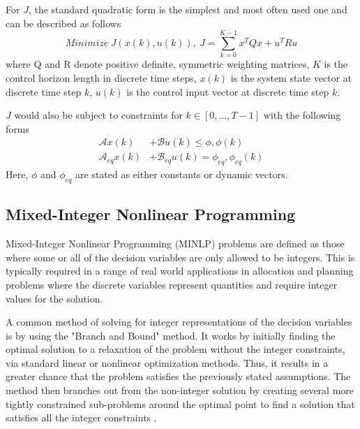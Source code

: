 \noindent For $J$, the standard quadratic form is the simplest and most often used one and can be described as follows
\begin{equation}
    Minimize\:J(x(k),u(k)),\: J=\sum_{k=0}^{K-1} x^{T}Qx + u^{T}Ru
\end{equation}
where Q and R denote positive definite, symmetric weighting matrices, $K$ is the control horizon length in discrete time steps, $x(k)$ is the system state vector at discrete time step $k$, $u(k)$ is the control input vector at discrete time step $k$.\newline

\noindent $J$ would also be subject to constraints for $k\in[0,\hdots,T-1]$ with the following forms
\begin{align}
    \mathcal{A}x(k) &+\mathcal{B}u(k)\leq \phi, \phi(k)  \label{leqeq}\\
    \mathcal{A}_{eq}x(k) &+\mathcal{B}_{eq}u(k) = \phi_{eq}, \phi_{eq}(k) \label{eqeq}
\end{align}
\noindent Here, $\phi$ and $\phi_{eq}$ are stated as either constants or dynamic vectors.

\subsection{Mixed-Integer Nonlinear Programming}
Mixed-Integer Nonlinear Programming (MINLP) problems are defined as those where some or all of the decision variables are only allowed to be integers. This is typically required in a range of real world applications in allocation and planning problems where the discrete variables represent quantities and require integer values for the solution. \newline

\noindent A common method of solving for integer representations of the decision variables is by using the "Branch and Bound" method. It works by initially finding the optimal solution to a relaxation of the problem without the integer constraints, via standard linear or nonlinear optimization methods. Thus, it results in a greater chance that the problem satisfies the previously stated assumptions. The method then branches out from the non-integer solution by creating several more tightly constrained sub-problems around the optimal point to find a solution that satisfies all the integer constraints \cite{frontlineSolversMIP}.\newline





